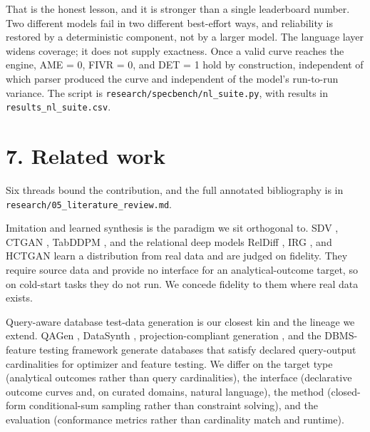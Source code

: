 That is the honest lesson, and it is stronger than a single leaderboard
number. Two different models fail in two different best-effort ways, and
reliability is restored by a deterministic component, not by a larger
model. The language layer widens coverage; it does not supply exactness.
Once a valid curve reaches the engine, AME = 0, FIVR = 0, and DET = 1
hold by construction, independent of which parser produced the curve and
independent of the model's run-to-run variance. The script is
\texttt{research/\allowbreak{}specbench/\allowbreak{}nl\_\allowbreak{}suite.py}, with results in
\texttt{results\_\allowbreak{}nl\_\allowbreak{}suite.csv}.

\hypertarget{related-work}{%
\section{7. Related work}\label{related-work}}

Six threads bound the contribution, and the full annotated bibliography
is in \texttt{research/\allowbreak{}05\_\allowbreak{}literature\_\allowbreak{}review.md}.

Imitation and learned synthesis is the paradigm we sit orthogonal to.
SDV \cite{patki2016sdv}, CTGAN \cite{xu2019ctgan}, TabDDPM
\cite{kotelnikov2023tabddpm}, and the relational deep models RelDiff
\cite{reldiff2025}, IRG \cite{irg2024}, and HCTGAN \cite{hctgan2024}
learn a distribution from real data and are judged on fidelity. They
require source data and provide no interface for an analytical-outcome
target, so on cold-start tasks they do not run. We concede fidelity to
them where real data exists.

Query-aware database test-data generation is our closest kin and the
lineage we extend. QAGen \cite{binnig2007qagen}, DataSynth
\cite{arasu2011datasynth}, projection-compliant generation
\cite{projectioncompliant2022}, and the DBMS-feature testing framework
\cite{lo2010framework} generate databases that satisfy declared
query-output cardinalities for optimizer and feature testing. We differ
on the target type (analytical outcomes rather than query
cardinalities), the interface (declarative outcome curves and, on
curated domains, natural language), the method (closed-form
conditional-sum sampling rather than constraint solving), and the
evaluation (conformance metrics rather than cardinality match and
runtime).

